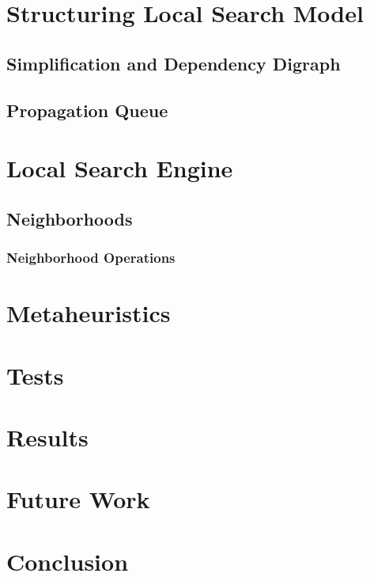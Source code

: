 \documentclass[a4paper,12pt]{article}
\begin{document}
\section{Structuring Local Search Model}

  \subsection{Simplification and Dependency Digraph}
  \subsection{Propagation Queue}  
    \label{sec_propaqueue}
    
  
  
\section{Local Search Engine}
  \subsection{Neighborhoods}
    \subsubsection{Neighborhood Operations}
\section{Metaheuristics}
\section{Tests}
\section{Results}
\section{Future Work}
  
\section{Conclusion}
\end{document}
